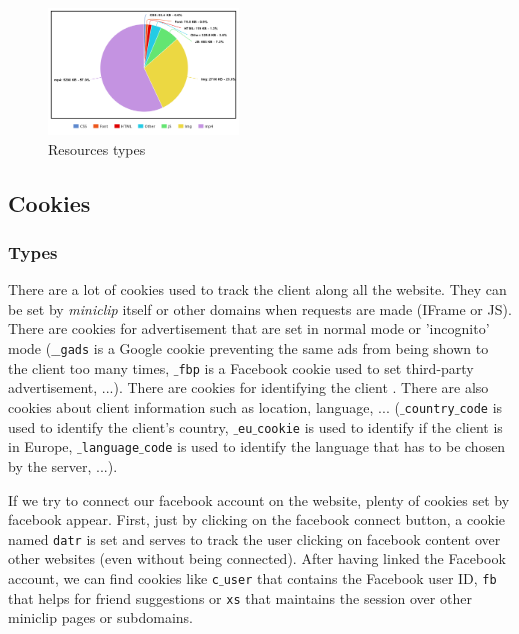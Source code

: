 \documentclass{article}
\begin{document}
\begin{figure}[h!]
    \centering
    \includegraphics[width=0.45\textwidth]{res/imgs/resources.png}
    \caption{Resources types}
    \label{fig:res}
\end{figure}

\subsection{Cookies}
\label{sub:cookies}

\subsubsection{Types}

There are a lot of cookies used to track the client along all the website. They can be set by \textit{miniclip} itself or other domains when requests are made (IFrame or JS). There are cookies for advertisement that are set in normal mode or 'incognito' mode (\texttt{$\_\_$gads} is a Google cookie preventing the same ads from being shown to the client too many times, \texttt{$\_$fbp} is a Facebook cookie used to set third-party advertisement, ...). There are cookies for identifying the client . There are also cookies about client information such as location, language, ... (\texttt{$\_$country$\_$code} is used to identify the client's country, \texttt{$\_$eu$\_$cookie} is used to identify if the client is in Europe, \texttt{$\_$language$\_$code} is used to identify the language that has to be chosen by the server, ...).

If we try to connect our facebook account on the website, plenty of cookies set by facebook appear. First, just by clicking on the facebook connect button, a cookie named \texttt{datr} is set and serves to track the user clicking on facebook content over other websites (even without being connected). After having linked the Facebook account, we can find cookies like \texttt{c$\_$user} that contains the Facebook user ID, \texttt{fb} that helps for friend suggestions or \texttt{xs} that maintains the session over other miniclip pages or subdomains.
\end{document}
